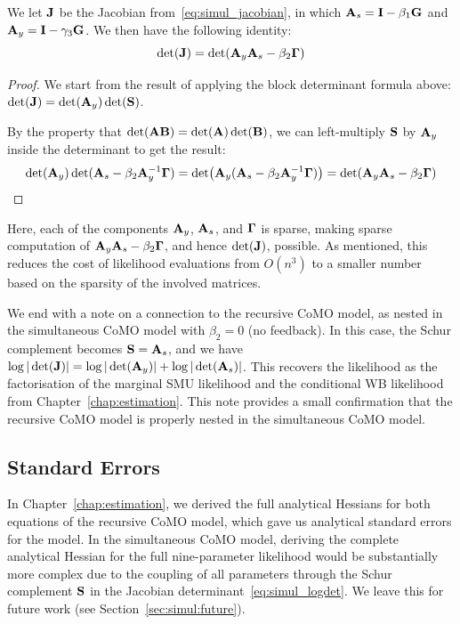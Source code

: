 \begin{lemma}
\label{lem:det_identity}
We let $\mathbf{J}$ be the Jacobian from~\eqref{eq:simul_jacobian}, in which $\mathbf{A}_s = \mathbf{I} - \beta_1\mathbf{G}$ and $\mathbf{A}_y = \mathbf{I} - \gamma_3\mathbf{G}$. We then have the following identity:
\begin{equation}
\label{eq:simul_det_efficient}
    \det(\mathbf{J}) = \det(\mathbf{A}_y\mathbf{A}_s - \beta_2\mathbf{\Gamma})
\end{equation}
\end{lemma}

\begin{proof}
We start from the result of applying the block determinant formula above: $\det(\mathbf{J}) = \det(\mathbf{A}_y)\det(\mathbf{S})$.

By the property that $\det(\mathbf{A}\mathbf{B}) = \det(\mathbf{A})\det(\mathbf{B})$, we can left-multiply $\mathbf{S}$ by $\mathbf{A}_y$ inside the determinant to get the result:
\begin{equation*}
    \det(\mathbf{A}_y)\det(\mathbf{A}_s - \beta_2\mathbf{A}_y^{-1}\mathbf{\Gamma})
    = \det\bigl(\mathbf{A}_y(\mathbf{A}_s - \beta_2\mathbf{A}_y^{-1}\mathbf{\Gamma})\bigr)
    = \det(\mathbf{A}_y\mathbf{A}_s - \beta_2\mathbf{\Gamma})
\end{equation*}
\end{proof}

Here, each of the components $\mathbf{A}_y$, $\mathbf{A}_s$, and $\mathbf{\Gamma}$ is sparse, making sparse computation of $\mathbf{A}_y\mathbf{A}_s - \beta_2\mathbf{\Gamma}$, and hence $\det(\mathbf{J})$, possible. As mentioned, this reduces the cost of likelihood evaluations from $O(n^3)$ to a smaller number based on the sparsity of the involved matrices.

We end with a note on a connection to the recursive CoMO model, as nested in the simultaneous CoMO model with $\beta_2 = 0$ (no feedback). In this case, the Schur complement becomes $\mathbf{S} = \mathbf{A}_s$, and we have $\log|\det(\mathbf{J})| = \log|\det(\mathbf{A}_y)| + \log|\det(\mathbf{A}_s)|$. This recovers the likelihood as the factorisation of the marginal SMU likelihood and the conditional WB likelihood from Chapter~\ref{chap:estimation}. This note provides a small confirmation that the recursive CoMO model is properly nested in the simultaneous CoMO model.

\subsection{Standard Errors}
\label{sec:simul:standard_errors}
In Chapter~\ref{chap:estimation}, we derived the full analytical Hessians for both equations of the recursive CoMO model, which gave us analytical standard errors for the model. In the simultaneous CoMO model, deriving the complete analytical Hessian for the full nine-parameter likelihood would be substantially more complex due to the coupling of all parameters through the Schur complement $\mathbf{S}$ in the Jacobian determinant~\eqref{eq:simul_logdet}. We leave this for future work (see Section~\ref{sec:simul:future}).

